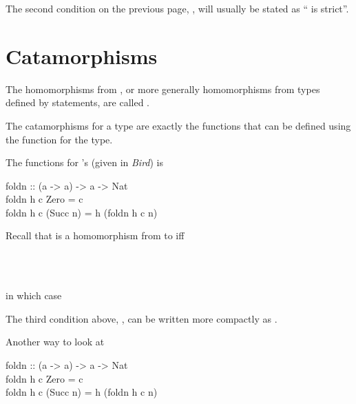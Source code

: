 \documentclass{seminar}
\begin{document}
\begin{slide}
The second condition on the previous page,
, will usually be stated as
`` is strict''.

\newpage

\section{Catamorphisms}

The homomorphisms from , or more generally homomorphisms from
types defined by \Has {} statements, are called
.

The catamorphisms for a type are exactly the functions that can be defined
using the  function for the type.

\newslide

The  functions for 's (given in \textit{Bird}) is

\begin{code}
foldn :: (a -> a) -> a -> Nat\\
foldn h c Zero = c\\
foldn h c (Succ n) = h (foldn h c n)
\end{code}

Recall that  is a homomorphism
from 
to  iff

\begin{codenott}
 ~ \color{black}{is strict}\\
\\
\end{codenott}

in which case 

\begin{codenott}
\end{codenott}

The third condition above,
,
can be written more compactly as .

\newslide

Another way to look at 

\begin{code}
foldn :: (a -> a) -> a -> Nat\\
foldn h c Zero = c\\
foldn h c (Succ n) = h (foldn h c n)
\end{code}


\end{slide}
\end{document}

